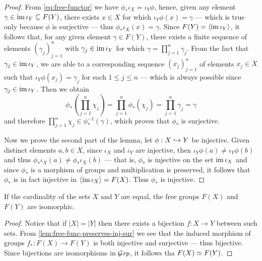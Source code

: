 \begin{proof}
From \cref{eq:free-functor} we have \(\phi_{*} \iota_{X} = \iota_{Y} \phi\), hence, given any
element \(\gamma \in \operatorname{im} \iota_{Y} \subseteq F(Y)\), there exists \(x \in X\) for which \(\iota_{Y} \phi(x) =
\gamma\) --- which is true only because \(\phi\) is surjective --- thus \(\phi_{*} \iota_X(x) = \gamma\).
Since \(F(Y) = \langle \operatorname{im} \iota_Y \rangle\), it follows that, for any given element \(\gamma \in
F(Y)\), there exists a finite sequence of elements \((\gamma_j)_{j=1}^n\) with \(\gamma_j
\in \operatorname{im} \iota_Y\) for which \(\gamma = \prod_{j=1}^n \gamma_j\). From the fact that \(\gamma_{j} \in \operatorname{im}
\iota_Y\), we are able to a corresponding sequence \((x_j)_{j=1}^n\) of elements
\(x_j \in X\) such that \(\iota_{Y} \phi(x_j) = \gamma_j\) for each \(1 \leq j \leq n\) --- which is
always possible since \(\gamma_j \in \operatorname{im} \iota_Y\). Then we obtain
\[
  \phi_{*}\left( \prod_{j=1}^n \chi_j \right) = \prod_{j=1}^n \phi_{*}(\chi_j)
  = \prod_{j=1}^n \gamma_j = \gamma
\]
and therefore \(\prod_{j=1}^n \chi_j \in \phi_{*}^{-1}(\gamma)\), which proves that \(\phi_{*}\) is
surjective.

Now we prove the second part of the lemma, let \(\phi: X \hookrightarrow Y\) be
injective. Given distinct elements \(a, b \in X\), since \(\iota_X\) and \(\iota_Y\) are
injective, then \(\iota_{Y} \phi(a) \neq \iota_Y \phi(b)\) and
thus \(\phi_{*}\iota_X(a) \neq \phi_{*}\iota_X(b)\) --- that is, \(\phi_{*}\) is injective on the set
\(\operatorname{im} \iota_X\) and since \(\phi_{*}\) is a morphism of groups and multiplication is
preserved, it follows that \(\phi_{*}\) is in fact injective in \(\langle \operatorname{im} \iota_X \rangle =
F(X)\). Thus \(\phi_{*}\) is injective.
\end{proof}

\begin{proposition}\label{prop:iso-free-grp}
If the cardinality of the sets \(X\) and \(Y\) are equal, the free groups
\(F(X)\) and \(F(Y)\) are isomorphic.
\end{proposition}

\begin{proof}
Notice that if \(|X| = |Y|\) then there exists a bijection \(f: X \to Y\)
between such sets. From \cref{lem:free-func-preserves-inj-sur} we see that the
induced morphism of groups \(f_{*}: F(X) \to F(Y)\) is both injective and
surjective --- thus bijective. Since bijections are isomorphisms in \({\mathcal{G}\textit{rp}}\), it
follows tha \(F(X) \simeq F(Y)\).
\end{proof}

